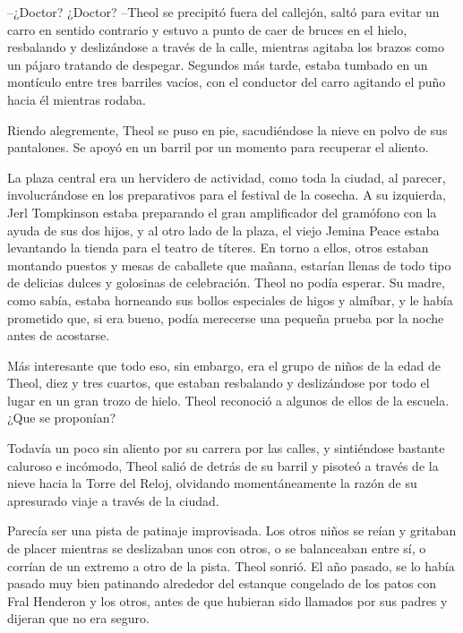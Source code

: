 --¿Doctor? ¿Doctor? --Theol se precipitó fuera del callejón, saltó para evitar un carro en sentido contrario y estuvo a punto de caer de bruces en el hielo, resbalando y deslizándose a través de la calle, mientras agitaba los brazos como un pájaro tratando de despegar. Segundos más tarde, estaba tumbado en un montículo entre tres barriles vacíos, con el conductor del carro agitando el puño hacia él mientras rodaba. 



Riendo alegremente, Theol se puso en pie, sacudiéndose la nieve en polvo de sus pantalones. Se apoyó en un barril por un momento para recuperar el aliento. 



La plaza central era un hervidero de actividad, como toda la ciudad, al parecer, involucrándose en los preparativos para el festival de la cosecha. A su izquierda, Jerl Tompkinson estaba preparando el gran amplificador del gramófono con la ayuda de sus dos hijos, y al otro lado de la plaza, el viejo Jemina Peace estaba levantando la tienda para el teatro de títeres. En torno a ellos, otros estaban montando puestos y mesas de caballete que mañana, estarían llenas de todo tipo de delicias dulces y golosinas de celebración. Theol no podía esperar. Su madre, como sabía, estaba horneando sus bollos especiales de higos y almíbar, y le había prometido que, si era bueno, podía merecerse una pequeña prueba por la noche antes de acostarse. 



Más interesante que todo eso, sin embargo, era el grupo de niños de la edad de Theol, diez y tres cuartos, que estaban resbalando y deslizándose por todo el lugar en un gran trozo de hielo. Theol reconoció a algunos de ellos de la escuela. ¿Que se proponían?



Todavía un poco sin aliento por su carrera por las calles, y sintiéndose bastante caluroso e incómodo, Theol salió de detrás de su barril y pisoteó a través de la nieve hacia la Torre del Reloj, olvidando momentáneamente la razón de su apresurado viaje a través de la ciudad. 



Parecía ser una pista de patinaje improvisada. Los otros niños se reían y gritaban de placer mientras se deslizaban unos con otros, o se balanceaban entre sí, o corrían de un extremo a otro de la pista. Theol sonrió. El año pasado, se lo había pasado muy bien patinando alrededor del estanque congelado de los patos con Fral Henderon y los otros, antes de que hubieran sido llamados por sus padres y dijeran que no era seguro.

